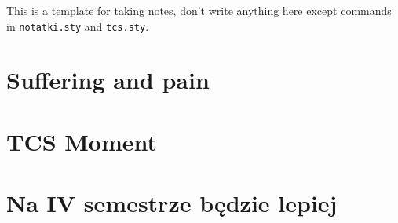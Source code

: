 \documentclass[12pt, a4paper, polish, openany]{book}
\begin{document}
\frontmatter



\tableofcontents


\mainmatter

This is a template for taking notes, don't write anything here except commands in \texttt{notatki.sty} and \texttt{tcs.sty}.

\chapter{Suffering and pain}

\chapter{TCS Moment}

\chapter{Na IV semestrze będzie lepiej}
\end{document}
